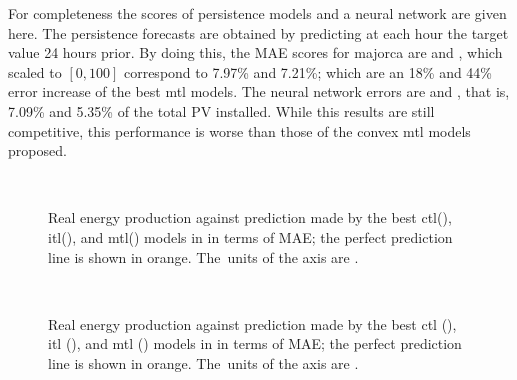 %
For completeness the scores of persistence models and a neural network are given here.
The persistence forecasts are obtained by predicting at each hour the target value 24 hours prior. By doing this, the MAE scores for majorca are  and , which scaled to $[0, 100]$ correspond to 7.97\% and 7.21\%; which are an 18\% and 44\% error increase of the best \acrshort{mtl} models.
The neural network errors are  and , that is, 7.09\% and 5.35\% of the total PV installed. While this results are still competitive, this performance is worse than those of the convex \acrshort{mtl} models proposed.


\begin{figure}[t!]
    \centering%
    \quad%
    \quad%
    \\
 \caption{\label{fig:majorca_best_plots} Real energy production against prediction made by the best \acrshort{ctl}(\protect{}), \acrshort{itl}(\protect{}), and \acrshort{mtl}(\protect{}) models {in}  in terms of MAE; the perfect prediction line is shown in orange. The~units of the axis are \mwhu{}.}
\end{figure}

\begin{figure}[t!]
    \centering%
    \quad%
    \quad%
    \\
 \caption{\label{fig:tenerife_best_plots} Real energy production against prediction made by the best \acrshort{ctl} (\protect{}), \acrshort{itl} (\protect{}), and \acrshort{mtl} (\protect{}) models {in}  in terms of MAE; the perfect prediction  line is shown in orange. The~units of the axis are \mwhu{}.}
\end{figure}


